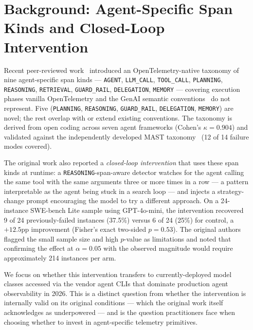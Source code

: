 \documentclass[journal]{IEEEtran}
\begin{document}
\section{Background: Agent-Specific Span Kinds and Closed-Loop Intervention}

Recent peer-reviewed work~\cite{aiware2026} introduced an OpenTelemetry-native taxonomy of nine agent-specific span kinds --- \texttt{AGENT}, \texttt{LLM\_CALL}, \texttt{TOOL\_CALL}, \texttt{PLANNING}, \texttt{REASONING}, \texttt{RETRIEVAL}, \texttt{GUARD\_RAIL}, \texttt{DELEGATION}, \texttt{MEMORY} --- covering execution phases vanilla OpenTelemetry and the GenAI semantic conventions~\cite{otel} do not represent. Five (\texttt{PLANNING}, \texttt{REASONING}, \texttt{GUARD\_RAIL}, \texttt{DELEGATION}, \texttt{MEMORY}) are novel; the rest overlap with or extend existing conventions. The taxonomy is derived from open coding across seven agent frameworks (Cohen's $\kappa = 0.904$) and validated against the independently developed MAST taxonomy~\cite{mast} (12 of 14 failure modes covered).

The original work also reported a \emph{closed-loop intervention} that uses these span kinds at runtime: a \texttt{REASONING}-span-aware detector watches for the agent calling the same tool with the same arguments three or more times in a row — a pattern interpretable as the agent being stuck in a search loop — and injects a strategy-change prompt encouraging the model to try a different approach. On a 24-instance SWE-bench Lite sample using GPT-4o-mini, the intervention recovered 9 of 24 previously-failed instances (37.5\%) versus 6 of 24 (25\%) for control, a $+12.5$pp improvement (Fisher's exact two-sided $p = 0.53$). The original authors flagged the small sample size and high $p$-value as limitations and noted that confirming the effect at $\alpha=0.05$ with the observed magnitude would require approximately 214 instances per arm.

We focus on whether this intervention transfers to currently-deployed model classes accessed via the vendor agent CLIs that dominate production agent observability in 2026. This is a distinct question from whether the intervention is internally valid on its original conditions — which the original work itself acknowledges as underpowered — and is the question practitioners face when choosing whether to invest in agent-specific telemetry primitives.
\end{document}
